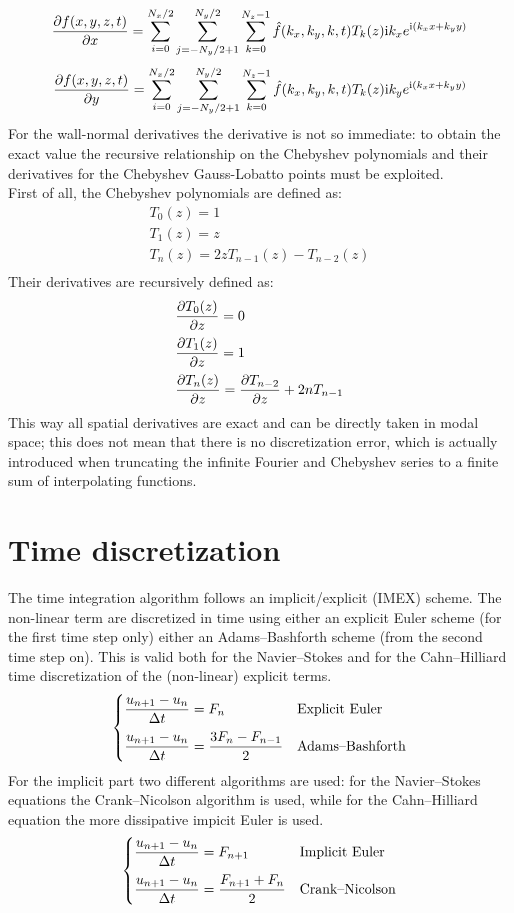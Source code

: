 \[
\frac{\partial f(x,y,z,t)}{\partial x}=\sum_{i=0}^{N_x/2}\sum_{j=-N_y/2+1}^{N_y/2}\sum_{k=0}^{N_z-1}\hat f(k_x,k_y,k,t)T_{k}(z) \textnormal{i} k_x e^{\textnormal{i}(k_xx+k_yy)}
\]
\[
\frac{\partial f(x,y,z,t)}{\partial y}=\sum_{i=0}^{N_x/2}\sum_{j=-N_y/2+1}^{N_y/2}\sum_{k=0}^{N_z-1}\hat f(k_x,k_y,k,t)T_{k}(z) \textnormal{i} k_y e^{\textnormal{i}(k_xx+k_yy)}
\]
For the wall-normal derivatives the derivative is not so immediate: to obtain the exact value the recursive relationship on the Chebyshev polynomials and their derivatives for the Chebyshev Gauss-Lobatto points must be exploited. \\
First of all, the Chebyshev polynomials are defined as:
\[
\begin{array}{l}
T_0(z)=1 \\
T_1(z)=z \\
T_{n}(z)=2zT_{n-1}(z)-T_{n-2}(z) \\
\end{array}
\]
Their derivatives are recursively defined as:
\[
\begin{array}{l}
\dfrac{\partial T_0(z)}{\partial z}=0 \\[2ex]
\dfrac{\partial T_1(z)}{\partial z}=1 \\[2ex]
\dfrac{\partial T_{n}(z)}{\partial z}=\dfrac{\partial T_{n-2}}{\partial z}+2nT_{n-1}\\
\end{array}
\]
This way all spatial derivatives are exact and can be directly taken in modal space; this does not mean that there is no discretization error, which is actually introduced when truncating the infinite Fourier and Chebyshev series to a finite sum of interpolating functions.

\section{Time discretization}
\label{sec: time_disc}
The time integration algorithm follows an implicit/explicit (IMEX) scheme. The non-linear term are discretized in time using either an explicit Euler scheme (for the first time step only) either an Adams--Bashforth scheme (from the second time step on). This is valid both for the Navier--Stokes and for the Cahn--Hilliard time discretization of the (non-linear) explicit terms.\\
\[
\begin{cases}
\dfrac{u_{n+1}-u_n}{\Delta t}=F_n  &\textnormal{Explicit Euler}\\[2ex]
\dfrac{u_{n+1}-u_n}{\Delta t}=\dfrac{3F_n-F_{n-1}}{2} & \textnormal{Adams--Bashforth}\\
\end{cases}
\]
For the implicit part two different algorithms are used: for the Navier--Stokes equations the Crank--Nicolson algorithm is used, while for the Cahn--Hilliard equation the more dissipative impicit Euler is used.
\[
\begin{cases}
\dfrac{u_{n+1}-u_n}{\Delta t}=F_{n+1}  &\textnormal{Implicit Euler}\\[2ex]
\dfrac{u_{n+1}-u_n}{\Delta t}=\dfrac{F_{n+1}+F_n}{2} & \textnormal{Crank--Nicolson}\\
\end{cases}
\]




